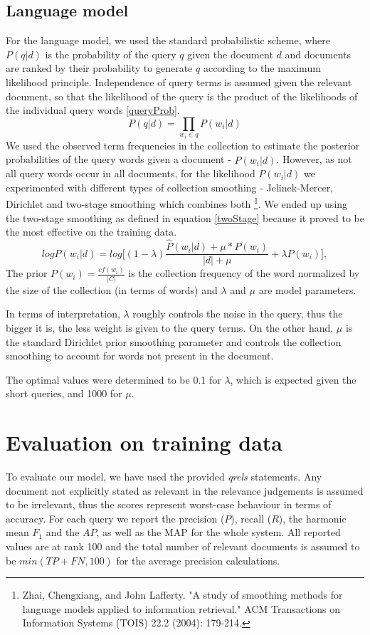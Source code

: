 \documentclass[a4paper, 11pt]{article}
\begin{document}
\subsection{Language model}
For the language model, we used the standard probabilistic scheme, where $P(q|d)$ is the probability of the query $q$ given the document $d$ and documents are ranked by their probability to generate $q$ according to the maximum likelihood principle. Independence of query terms is assumed given the relevant document, so that the likelihood of the query is the product of the likelihoods of the individual query words \ref{queryProb}.
\begin{equation}
P(q|d) = \prod_{w_i\in q} P(w_i|d)
\label{queryProb} 
\end{equation}
We used the observed term frequencies in the collection to estimate the posterior probabilities of the query words given a document - $\hat{P}(w_i|d)$. However, as not all query words occur in all documents, for the likelihood $P(w_i|d)$ we experimented with different types of collection smoothing - Jelinek-Mercer, Dirichlet and two-stage smoothing which combines both \footnote{Zhai, Chengxiang, and John Lafferty. "A study of smoothing methods for language models applied to information retrieval." ACM Transactions on Information Systems (TOIS) 22.2 (2004): 179-214.}. We ended up using the two-stage smoothing as defined in equation \ref{twoStage} because it proved to be the most effective on the training data.
\begin{equation}
log{P(w_i|d)} = log\Big[(1-\lambda)\frac{\hat{P}(w_i|d) + \mu*P(w_i)}{|d| + \mu} + \lambda P(w_i)\Big],
\label{twoStage}
\end{equation}
The prior $P(w_i) = \frac{cf(w_i)}{|C|}$ is the collection frequency of the word normalized by the size of the collection (in terms of words) and $\lambda$ and $\mu$ are model parameters. 

In terms of interpretation, $\lambda$ roughly controls the noise in the query, thus the bigger it is, the less weight is given to the query terms. On the other hand, $\mu$ is the standard Dirichlet prior smoothing parameter and controls the collection smoothing to account for words not present in the document. 

The optimal values were determined to be 0.1 for $\lambda$, which is expected given the short queries, and 1000 for $\mu$.


\section{Evaluation on training data}
To evaluate our model, we have used the provided \textit{qrels} statements. Any document not explicitly stated as relevant in the relevance judgements is assumed to be irrelevant, thus the scores represent worst-case behaviour in terms of accuracy. For each query we report the precision ($P$), recall ($R$), the harmonic mean $F_1$ and the $AP$, as well as the MAP for the whole system. All reported values are at rank 100 and the total number of relevant documents is assumed to be $min(TP+FN, 100)$ for the average precision calculations.
\end{document}

